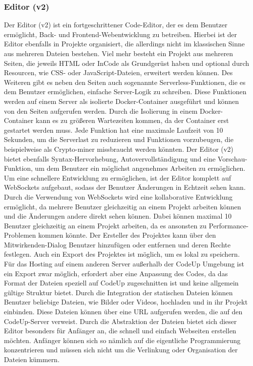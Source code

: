 \documentclass[main.tex]{subfiles}
\begin{document}
    \subsubsection{Editor (v2)}
    Der Editor (v2) ist ein fortgeschrittener Code-Editor, der es dem Benutzer ermöglicht, Back- und Frontend-Webentwicklung zu betreiben.
    Hierbei ist der Editor ebenfalls in Projekte organisiert, die allerdings nicht im klassischen Sinne aus mehreren Dateien bestehen.
    Viel mehr besteht ein Projekt aus mehreren Seiten, die jeweils HTML oder InCode als Grundgerüst haben und optional durch Resourcen, wie CSS- oder JavaScript-Dateien, erweitert werden können.
    Des Weiteren gibt es neben den Seiten auch sogenannte Serverless-Funktionen, die es dem Benutzer ermöglichen, einfache Server-Logik zu schreiben.
    Diese Funktionen werden auf einem Server als isolierte Docker-Container ausgeführt und können von den Seiten aufgerufen werden.
    Durch die Isolierung in einem Docker-Container kann es zu größeren Wartezeiten kommen, da der Container erst gestartet werden muss.
    Jede Funktion hat eine maximale Laufzeit von 10 Sekunden, um die Serverlast zu reduzieren und Funktionen vorzubeugen, die beispielweise als Crypto-miner missbraucht werden könnten.
    Der Editor (v2) bietet ebenfalls Syntax-Hervorhebung, Autovervollständigung und eine Vorschau-Funktion, um dem Benutzer ein möglichst angenehmes Arbeiten zu ermöglichen.
    Um eine schnellere Entwicklung zu ermöglichen, ist der Editor komplett auf WebSockets aufgebaut, sodass der Benutzer Änderungen in Echtzeit sehen kann.
    Durch die Verwendung von WebSockets wird eine kollaborative Entwicklung ermöglicht, da mehrere Benutzer gleichzeitig an einem Projekt arbeiten können und die Änderungen andere direkt sehen können.
    Dabei können maximal 10 Benutzer gleichzeitig an einem Projekt arbeiten, da es ansonsten zu Performance-Problemen kommen könnte.
    Der Ersteller des Projektes kann über den Mitwirkenden-Dialog Benutzer hinzufügen oder entfernen und deren Rechte festlegen.
    Auch ein Export des Projektes ist möglich, um es lokal zu speichern.
    Für das Hosting auf einem anderen Server außerhalb der CodeUp Umgebung ist ein Export zwar möglich, erfordert aber eine Anpassung des Codes, da das Format der Dateien speziell auf CodeUp zugeschnitten ist und keine allgemein gültige Struktur bietet.
    Durch die Integration der statischen Dateien können Benutzer beliebige Dateien, wie Bilder oder Videos, hochladen und in ihr Projekt einbinden.
    Diese Dateien können über eine URL aufgerufen werden, die auf den CodeUp-Server verweist.
    Durch die Abstraktion der Dateien bietet sich dieser Editor besonders für Anfänger an, die schnell und einfach Webseiten erstellen möchten.
    Anfänger können sich so nämlich auf die eigentliche Programmierung konzentrieren und müssen sich nicht um die Verlinkung oder Organisation der Dateien kümmern.
\end{document}

